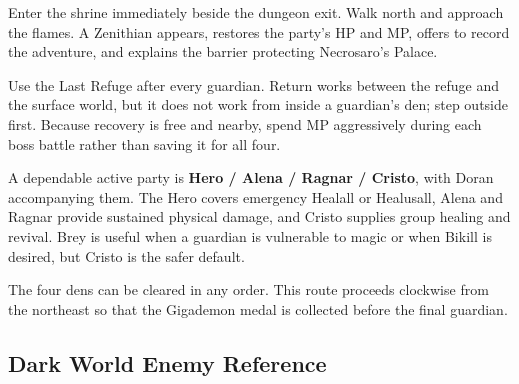 \documentclass[
  american,
  10pt,
  letterpaper,
  oneside,
  open=any]{scrreprt}
\begin{document}
Enter the shrine immediately beside the dungeon exit. Walk north and
approach the flames. A Zenithian appears, restores the party's HP and
MP, offers to record the adventure, and explains the barrier protecting
Necrosaro's Palace.

Use the Last Refuge after every guardian. Return works between the
refuge and the surface world, but it does not work from inside a
guardian's den; step outside first. Because recovery is free and nearby,
spend MP aggressively during each boss battle rather than saving it for
all four.

A dependable active party is \textbf{Hero / Alena / Ragnar / Cristo},
with Doran accompanying them. The Hero covers emergency Healall or
Healusall, Alena and Ragnar provide sustained physical damage, and
Cristo supplies group healing and revival. Brey is useful when a
guardian is vulnerable to magic or when Bikill is desired, but Cristo is
the safer default.

The four dens can be cleared in any order. This route proceeds clockwise
from the northeast so that the Gigademon medal is collected before the
final guardian.

\subsection{Dark World Enemy
Reference}\label{dark-world-enemy-reference}
\end{document}
